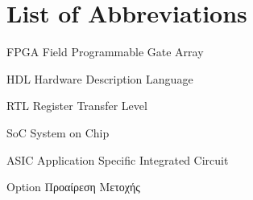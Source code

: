 \chapter*{List of Abbreviations}

\begin{abbrv}
    \item[FPGA]			 Field Programmable Gate Array
    \item[HDL]			 Hardware Description Language
    \item[RTL]			 Register Transfer Level
    \item[SoC]			 System on Chip
    \item[ASIC]			 Application Specific Integrated Circuit
    \item[Option]		 Προαίρεση Μετοχής

\end{abbrv}
